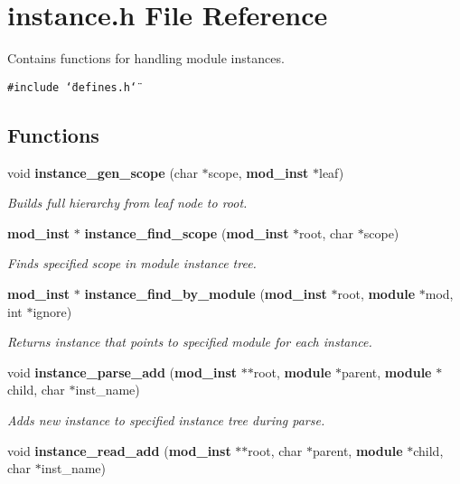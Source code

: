 \section{instance.h File Reference}
\label{instance_8h}
Contains functions for handling module instances.  


{\tt \#include \char`\"{}defines.h\char`\"{}}\par
\subsection*{Functions}
\begin{CompactItemize}
\item 
void {\bf instance\_\-gen\_\-scope} (char $\ast$scope, {\bf mod\_\-inst} $\ast$leaf)
\begin{CompactList}\small\item\em Builds full hierarchy from leaf node to root. \item\end{CompactList}\item 
{\bf mod\_\-inst} $\ast$ {\bf instance\_\-find\_\-scope} ({\bf mod\_\-inst} $\ast$root, char $\ast$scope)
\begin{CompactList}\small\item\em Finds specified scope in module instance tree. \item\end{CompactList}\item 
{\bf mod\_\-inst} $\ast$ {\bf instance\_\-find\_\-by\_\-module} ({\bf mod\_\-inst} $\ast$root, {\bf module} $\ast$mod, int $\ast$ignore)
\begin{CompactList}\small\item\em Returns instance that points to specified module for each instance. \item\end{CompactList}\item 
void {\bf instance\_\-parse\_\-add} ({\bf mod\_\-inst} $\ast$$\ast$root, {\bf module} $\ast$parent, {\bf module} $\ast$child, char $\ast$inst\_\-name)
\begin{CompactList}\small\item\em Adds new instance to specified instance tree during parse. \item\end{CompactList}\item 
void {\bf instance\_\-read\_\-add} ({\bf mod\_\-inst} $\ast$$\ast$root, char $\ast$parent, {\bf module} $\ast$child, char $\ast$inst\_\-name)

\end{CompactItemize}
